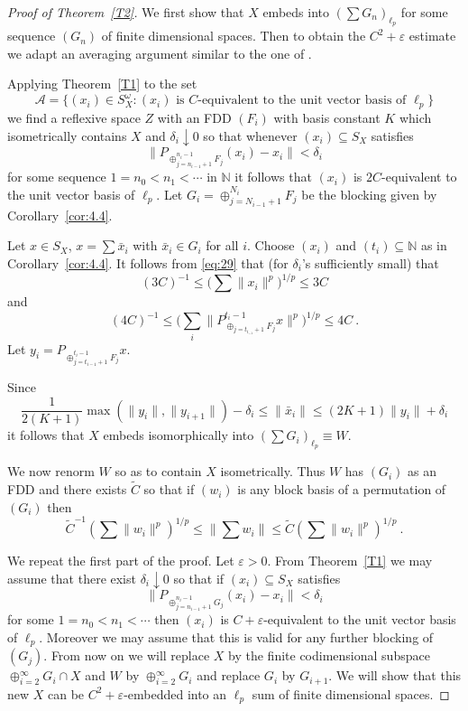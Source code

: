 \documentclass[11pt,leqno]{amsart}
\theoremstyle{definition}
\newcommand{\vp}{\varepsilon}
\newcommand{\cA}{\mathcal{A}}
\newcommand{\N}{\mathbb{N}}
\begin{document}
\begin{proof}[Proof of Theorem~\ref{T2}]
We first show that $X$ embeds into $(\sum G_n)_{\ell_p}$ for some 
sequence $(G_n)$ of finite dimensional spaces. 
Then to obtain the $C^2 +\vp$ estimate we adapt an averaging argument 
 similar to the one of \cite{KW}. 

Applying Theorem~\ref{T1} to the set 
$$\cA = \{ (x_i)\in S_X^\omega :(x_i) \text{ is $C$-equivalent to the 
unit vector basis of }\ell_p\}$$
we find a reflexive space $Z$ with an FDD $(F_i)$ with basis constant $K$ 
which isometrically contains $X$ and $\delta_i\downarrow 0$ so that 
whenever $(x_i)\subseteq S_X$ satisfies 
\begin{equation}\label{eq:29}
\|P_{\oplus_{j=n_{i-1}+1}^{n_i-1}F_j} (x_i) - x_i\| < \delta_i
\end{equation} 
for some sequence $1= n_0 < n_1 < \cdots $ in $\N$ it follows that $(x_i)$ 
is $2C$-equivalent to the unit vector basis of $\ell_p$. 
Let $G_i = \oplus_{j=N_{i-1}+1}^{N_i} F_j$ be the blocking given by 
Corollary~\ref{cor:4.4}. 

Let $x\in S_X$, $x= \sum \bar x_i$ with $\bar x_i\in G_i$ for all $i$. 
Choose $(x_i)$ and $(t_i)\subseteq \N$ as in Corollary~\ref{cor:4.4}. 
It follows from \eqref{eq:29} that (for $\delta_i$'s sufficiently small) 
that 
$$(3C)^{-1} \le \Big(\sum \|x_i\|^p\Big)^{1/p} \le 3C$$
and 
$$(4C)^{-1} \le \biggl(\sum_i \|P_{\oplus_{j=t_{i_{-1}}+1}F_j}^{t_i-1} x\|^p
\biggr)^{1/p} \le 4C\ .$$
Let $y_i = P_{\oplus_{j=t_{i-1}+1}^{t_i-1}F_j} x$. 

Since 
$$\frac1{2(K+1)} \max (\|y_i\|,\|y_{i+1}\|) - \delta_i 
\le \|\bar x_i\| \le (2K+1) \|y_i\| +\delta_i$$
it follows that $X$ embeds isomorphically into $(\sum G_i)_{\ell_p} 
\equiv W$. 

We now renorm $W$ so as to contain $X$ isometrically. 
Thus $W$ has $(G_i)$ as an FDD and there exists $\tilde C$ so that 
if $(w_i)$ is any block basis of a permutation of $(G_i)$ then 
\begin{equation}\label{eq:30} 
\tilde C^{-1} (\sum \|w_i\|^p)^{1/p} \le \|\sum w_i\| 
\le \tilde C(\sum \|w_i\|^p)^{1/p}\ .
\end{equation}

We repeat the first part of the proof. 
Let $\vp>0$. 
{From} Theorem~\ref{T1} we may assume that there exist $\delta_i\downarrow0$ 
so that if $(x_i)\subseteq S_X$ satisfies 
\begin{equation}\label{eq:31} 
\|P_{\oplus_{j=n_{i-1}+1}^{n_i-1} G_j} (x_i) - x_i\| <\delta_i
\end{equation} 
for some $1=n_0<n_1<\cdots$ then $(x_i)$ is $C+\vp$-equivalent to the unit 
vector basis of $\ell_p$. 
Moreover we may assume that this is valid for any further blocking of 
$(G_j)$. 
{From} now on we will replace $X$ by the finite codimensional subspace 
$\oplus_{i=2}^\infty G_i\cap X$ and $W$ by $\oplus_{i=2}^\infty G_i$ and replace 
$G_i$ by $G_{i+1}$. 
We will show that this new $X$ can be $C^2+\vp$-embedded into an $\ell_p$ 
sum of finite dimensional spaces. 


\end{proof}
\end{document}
